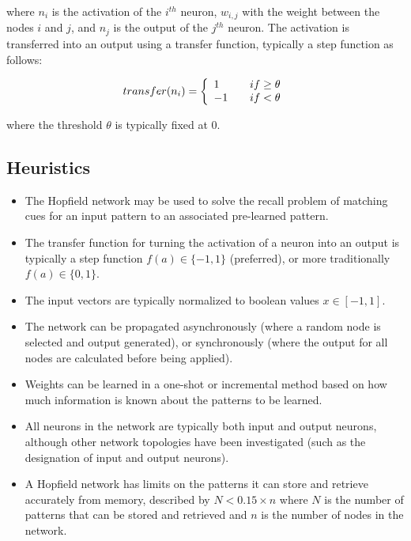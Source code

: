 where $n_i$ is the activation of the $i^{th}$ neuron, $w_{i,j}$ with the weight between the nodes $i$ and $j$, and $n_j$ is the output of the $j^{th}$ neuron. The activation is transferred into an output using a transfer function, typically a step function as follows:

\[transfer(n_i) = \left\{ \begin{array}{l l} 1 & \quad if \geq \theta \\ -1 & \quad if < \theta \\ \end{array} \right. \]

where the threshold $\theta$ is typically fixed at 0.

\subsection{Heuristics}
\begin{itemize}
	\item The Hopfield network may be used to solve the recall problem of matching cues for an input pattern to an associated pre-learned pattern.
	\item The transfer function for turning the activation of a neuron into an output is typically a step function $f(a) \in \{-1,1\}$ (preferred), or more traditionally $f(a) \in \{0,1\}$.
	\item The input vectors are typically normalized to boolean values $x \in [-1,1]$.
	\item The network can be propagated asynchronously (where a random node is selected and output generated), or synchronously (where the output for all nodes are calculated before being applied).
	\item Weights can be learned in a one-shot or incremental method based on how much information is known about the patterns to be learned.
	\item All neurons in the network are typically both input and output neurons, although other network topologies have been investigated (such as the designation of input and output neurons).
	\item A Hopfield network has limits on the patterns it can store and retrieve accurately from memory, described by $N<0.15\times n$ where $N$ is the number of patterns that can be stored and retrieved and $n$ is the number of nodes in the network.
\end{itemize}


